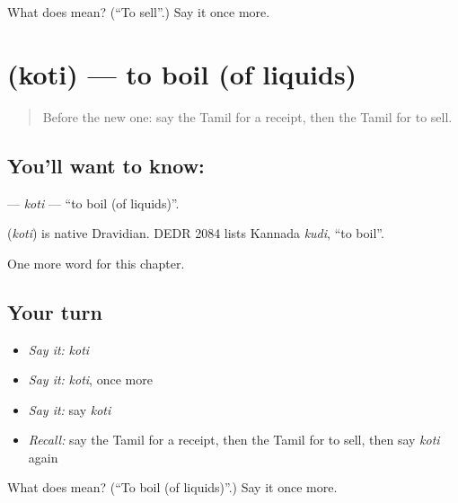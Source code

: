\begin{tcolorbox}[breakable,colback=teal!4,colframe=teal!35!black,title={Before you move on}]
What does  mean? (\textquotedblleft{}To sell\textquotedblright{}.) Say it once more.
\end{tcolorbox}
\section[\texorpdfstring{\ta{கொதி} (koti)}{கொதி (koti)}]{ (koti) — to boil (of liquids)}

\label{lesson:TA-C161-koti}



\begin{quote}
Before the new one: say the Tamil for a receipt, then the Tamil for to sell.
\end{quote}

\subsection*{You'll want to know: }
\textbf{} — \emph{koti} — \textquotedblleft{}to boil (of liquids)\textquotedblright{}.

\begin{cousinweb}
\textbf{} (\emph{koti}) is native Dravidian. DEDR 2084 lists Kannada \emph{kudi}, \textquotedblleft{}to boil\textquotedblright{}.
\end{cousinweb}

\begin{grammarlens}[title={What you've built}]
One more word for this chapter.
\end{grammarlens}

\subsection*{Your turn}
\begin{itemize}
\raggedright
  \item \emph{Say it:} \emph{koti}
  \item \emph{Say it:} \emph{koti}, once more
  \item \emph{Say it:} say \emph{koti}
  \item \emph{Recall:} say the Tamil for a receipt, then the Tamil for to sell, then say \emph{koti} again
\end{itemize}

\begin{tcolorbox}[breakable,colback=teal!4,colframe=teal!35!black,title={Before you move on}]
What does  mean? (\textquotedblleft{}To boil (of liquids)\textquotedblright{}.) Say it once more.
\end{tcolorbox}

